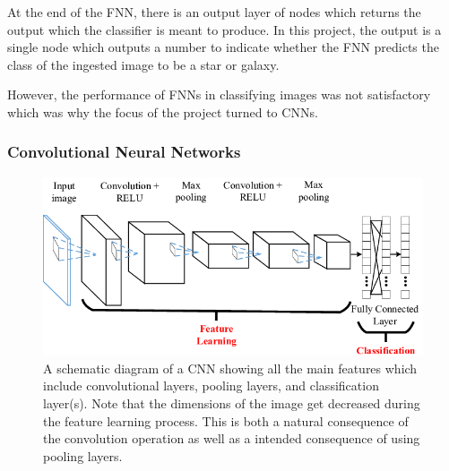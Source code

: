 \documentclass[a4paper,fleqn,usenatbib]{mnras}
\begin{document}
At the end of the FNN, there is an output layer of nodes which returns the output which the classifier is meant to produce. In this project, the output is a single node which outputs a number to indicate whether the FNN predicts the class of the ingested image to be a star or galaxy.


However, the performance of FNNs in classifying images was not satisfactory which was why the focus of the project turned to CNNs.

\subsubsection{Convolutional Neural Networks}
\begin{figure}
\includegraphics[width=\columnwidth]{../Figures/CNNdiag}
\caption{A schematic diagram of a CNN showing all the main features which include convolutional layers, pooling layers, and classification layer(s). Note that the dimensions of the image get decreased during the feature learning process. This is both a natural consequence of the convolution operation as well as a intended consequence of using pooling layers. \protect\citep{CNNdiag}\label{figure:CNNdiag}}
\end{figure}
\end{document}
